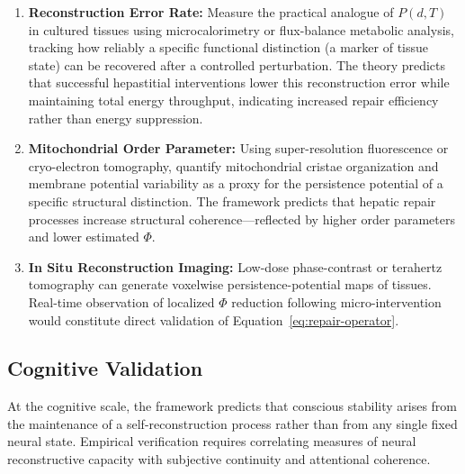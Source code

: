 \documentclass[12pt]{article}
\begin{document}
\begin{enumerate}[leftmargin=*, label=(\alph*)]
\item \textbf{Reconstruction Error Rate:} Measure the practical analogue of $P(d,T)$ in cultured tissues using microcalorimetry or flux-balance metabolic analysis, tracking how reliably a specific functional distinction (a marker of tissue state) can be recovered after a controlled perturbation. The theory predicts that successful hepastitial interventions lower this reconstruction error while maintaining total energy throughput, indicating increased repair efficiency rather than energy suppression.

\item \textbf{Mitochondrial Order Parameter:} Using super-resolution fluorescence or cryo-electron tomography, quantify mitochondrial cristae organization and membrane potential variability as a proxy for the persistence potential of a specific structural distinction. The framework predicts that hepatic repair processes increase structural coherence---reflected by higher order parameters and lower estimated $\Phi$.

\item \textbf{In Situ Reconstruction Imaging:} Low-dose phase-contrast or terahertz tomography can generate voxelwise persistence-potential maps of tissues. Real-time observation of localized $\Phi$ reduction following micro-intervention would constitute direct validation of Equation~\eqref{eq:repair-operator}.
\end{enumerate}

\subsection{Cognitive Validation}

At the cognitive scale, the framework predicts that conscious stability arises from the maintenance of a self-reconstruction process rather than from any single fixed neural state. Empirical verification requires correlating measures of neural reconstructive capacity with subjective continuity and attentional coherence.
\end{document}
